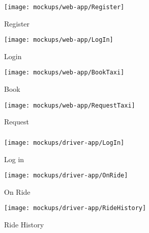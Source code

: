 \newpage
\subsubsection{ }
\vfill
\begin{figure}[h!t]
\caption{Register}
\texttt{[image: mockups/web-app/Register]}
\centering
\end{figure}
\vfill
\clearpage

\newpage
\vfill
\begin{figure}[h!t]
\caption{Login}
\texttt{[image: mockups/web-app/LogIn]}
\centering
\end{figure}
\vfill
\clearpage

\newpage
\vfill
\begin{figure}[h!t]
\caption{Book}
\texttt{[image: mockups/web-app/BookTaxi]}
\centering
\end{figure}
\vfill
\clearpage

\newpage
\vfill
\begin{figure}[h!t]
\caption{Request}
\texttt{[image: mockups/web-app/RequestTaxi]}
\centering
\end{figure}
\vfill
\clearpage

\newpage
\subsubsection{ }
\vfill
\begin{figure*}[h!t]
    \centering
    \begin{subfigure}[h!t]{0.24\paperwidth}
            \texttt{[image: mockups/driver-app/LogIn]}
            \caption{Log in}
    \end{subfigure}
    \hspace{0.02\paperwidth}
    \begin{subfigure}[h!t]{0.24\paperwidth}
            \texttt{[image: mockups/driver-app/OnRide]}
            \caption{On Ride}
    \end{subfigure}
    \hspace{0.02\paperwidth}
    \begin{subfigure}[h!t]{0.24\paperwidth}
            \texttt{[image: mockups/driver-app/RideHistory]}
            \caption{Ride History}
    \end{subfigure}
\end{figure*}
\vfill
\clearpage


